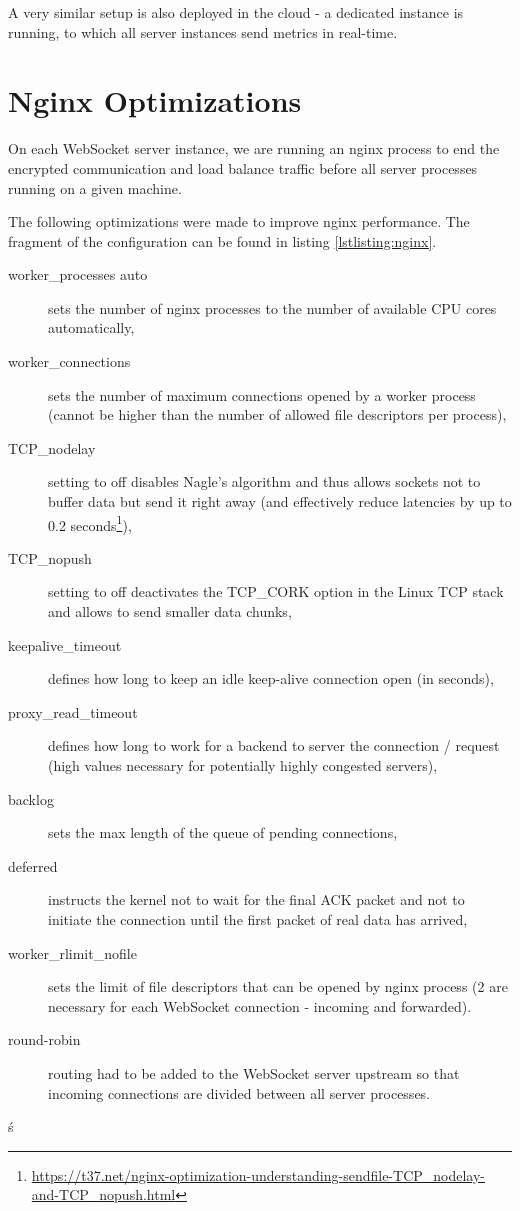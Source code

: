 \documentclass{uvamscse}
\begin{document}
A very similar setup is also deployed in the cloud - a dedicated instance is running, to which all server instances send metrics in real-time.

\section{Nginx Optimizations}
On each WebSocket server instance, we are running an nginx process to end the encrypted communication and load balance traffic before all server processes running on a given machine.

The following optimizations were made to improve nginx performance. The fragment of the configuration can be found in listing \ref{lstlisting:nginx}.

\begin{description}
  \item [worker\_processes auto] sets the number of nginx processes to the number of available CPU cores automatically,
  \item [worker\_connections] sets the number of maximum connections opened by a worker process (cannot be higher than the number of allowed file descriptors per process),
  \item [TCP\_nodelay] setting to off disables Nagle’s algorithm and thus allows sockets not to buffer data but send it right away (and effectively reduce latencies by up to 0.2 seconds\footnote{\url{https://t37.net/nginx-optimization-understanding-sendfile-TCP\_nodelay-and-TCP_nopush.html}}),
  \item [TCP\_nopush] setting to off deactivates the TCP\_CORK option in the Linux TCP stack and allows to send smaller data chunks,
  \item [keepalive\_timeout] defines how long to keep an idle keep-alive connection open (in seconds),
  \item [proxy\_read\_timeout] defines how long to work for a backend to server the connection / request (high values necessary for potentially highly congested servers),
  \item [backlog] sets the max length of the queue of pending connections,
  \item [deferred] instructs the kernel not to wait for the final ACK packet and not to initiate the connection until the first packet of real data has arrived,
  \item [worker\_rlimit\_nofile] sets the limit of file descriptors that can be opened by nginx process (2 are necessary for each WebSocket connection - incoming and forwarded).
  \item [round-robin] routing had to be added to the WebSocket server upstream so that incoming connections are divided between all server processes.
\end{description}ś
\end{document}

